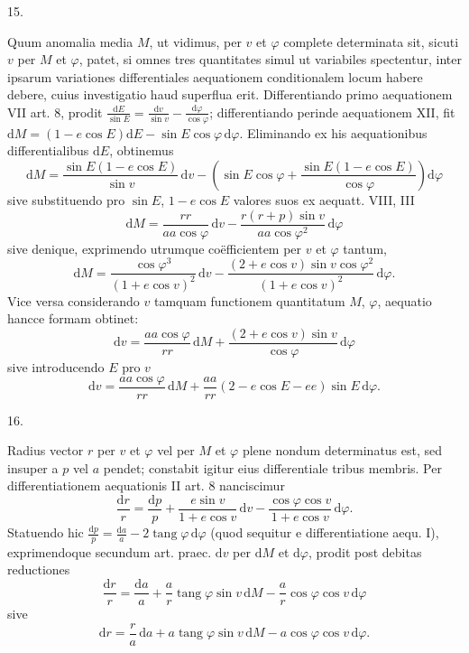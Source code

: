 \begin{center}
\hypertarget{native-033-article015}{}15.
\end{center}
Quum anomalia media $M$, ut vidimus, per $v$ et $\varphi$ complete determinata sit, sicuti $v$ per $M$ et $\varphi$, patet, si omnes tres quantitates simul ut variabiles spectentur, inter ipsarum variationes differentiales aequationem conditionalem locum habere debere, cuius investigatio haud superflua erit. Differentiando primo aequationem VII art. 8, prodit $\frac{\mathrm{d}E}{\sin E}=\frac{\mathrm{d}v}{\sin v}-\frac{\mathrm{d}\varphi}{\cos\varphi}$; differentiando perinde aequationem XII, fit $\mathrm{d}M=(1-e\cos E)\mathrm{d}E-\sin E\cos\varphi\,\mathrm{d}\varphi$. Eliminando ex his aequationibus differentialibus $\mathrm{d}E$, obtinemus
\[
\mathrm{d}M=\frac{\sin E(1-e\cos E)}{\sin v}\,\mathrm{d}v-\left(\sin E\cos\varphi+\frac{\sin E(1-e\cos E)}{\cos\varphi}\right)\mathrm{d}\varphi
\]
sive substituendo pro $\sin E$, $1-e\cos E$ valores suos ex aequatt. VIII, III
\[
\mathrm{d}M=\frac{r r}{a a\cos\varphi}\,\mathrm{d}v-\frac{r(r+p)\sin v}{a a\cos\varphi^2}\,\mathrm{d}\varphi
\]
sive denique, exprimendo utrumque coëfficientem per $v$ et $\varphi$ tantum,
\[
\mathrm{d}M=\frac{\cos\varphi^3}{(1+e\cos v)^2}\,\mathrm{d}v-\frac{(2+e\cos v)\sin v\cos\varphi^2}{(1+e\cos v)^2}\,\mathrm{d}\varphi.
\]
Vice versa considerando $v$ tamquam functionem quantitatum $M$, $\varphi$, aequatio hancce formam obtinet:
\[
\mathrm{d}v=\frac{a a\cos\varphi}{r r}\,\mathrm{d}M+\frac{(2+e\cos v)\sin v}{\cos\varphi}\,\mathrm{d}\varphi
\]
sive introducendo $E$ pro $v$\,
\[
\mathrm{d}v=\frac{a a\cos\varphi}{r r}\,\mathrm{d}M+\frac{a a}{r r}(2-e\cos E-e e)\sin E\,\mathrm{d}\varphi.
\]

\begin{center}
\hypertarget{native-034-article016}{}16.
\end{center}
Radius vector $r$ per $v$ et $\varphi$ vel per $M$ et $\varphi$ plene nondum determinatus est, sed insuper a $p$ vel $a$ pendet; constabit igitur eius differentiale tribus membris. Per differentiationem aequationis II art. 8 nanciscimur
\[
\frac{\mathrm{d}r}{r}=\frac{\mathrm{d}p}{p}+\frac{e\sin v}{1+e\cos v}\,\mathrm{d}v-\frac{\cos\varphi\cos v}{1+e\cos v}\,\mathrm{d}\varphi.
\]
Statuendo hic $\frac{\mathrm{d}p}{p}=\frac{\mathrm{d}a}{a}-2\operatorname{tang}\varphi\,\mathrm{d}\varphi$ (quod sequitur e differentiatione aequ. I), exprimendoque secundum art. praec. $\mathrm{d}v$ per $\mathrm{d}M$ et $\mathrm{d}\varphi$, prodit post debitas reductiones
\[
\frac{\mathrm{d}r}{r}=\frac{\mathrm{d}a}{a}+\frac{a}{r}\operatorname{tang}\varphi\sin v\,\mathrm{d}M-\frac{a}{r}\cos\varphi\cos v\,\mathrm{d}\varphi
\]
sive
\[
\mathrm{d}r=\frac{r}{a}\,\mathrm{d}a+a\operatorname{tang}\varphi\sin v\,\mathrm{d}M-a\cos\varphi\cos v\,\mathrm{d}\varphi.
\]


